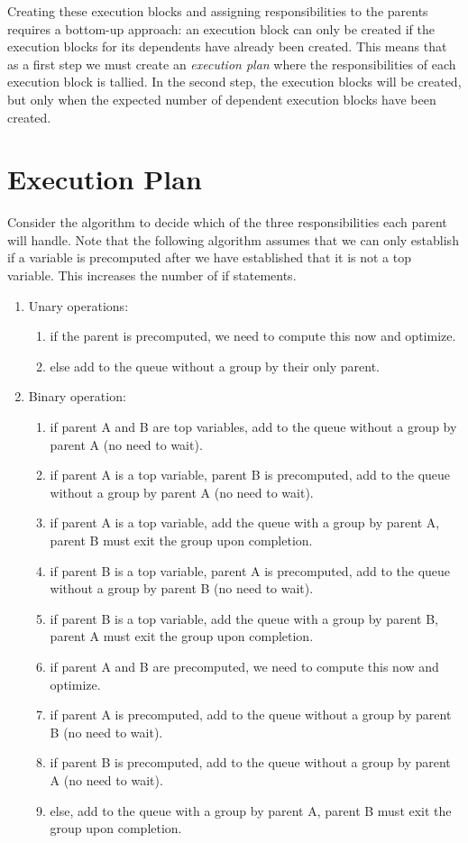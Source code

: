 \documentclass[11pt]{article}
\begin{document}
Creating these execution blocks and assigning responsibilities to the parents requires a bottom-up approach: an execution block can only be created if the execution blocks for its dependents have already been created. This means that as a first step we must create an \emph{execution plan} where the responsibilities of each execution block is tallied. In the second step, the execution blocks will be created, but only when the expected number of dependent execution blocks have been created.

\section{Execution Plan}

Consider the algorithm to decide which of the three responsibilities each parent will handle. Note that the following algorithm assumes that we can only establish if a variable is precomputed after we have established that it is not a top variable. This increases the number of if statements.

\begin{enumerate}
\item Unary operations:
\begin{enumerate}
\item if the parent is precomputed, we need to compute this now and optimize.
\item else add to the queue without a group by their only parent.
\end{enumerate}
\item Binary operation:
\begin{enumerate}
\item if parent A and B are top variables,  add to the queue without a group by parent A (no need to wait).
\item if parent A is a top variable, parent B is precomputed, add to the queue without a group by parent A (no need to wait).
\item if parent A is a top variable, add the queue with a group by parent A, parent B must exit the group upon completion.
\item if parent B is a top variable, parent A is precomputed, add to the queue without a group by parent B (no need to wait).
\item if parent B is a top variable, add the queue with a group by parent B, parent A must exit the group upon completion.
\item if parent A and B are precomputed, we need to compute this now and optimize.
\item if parent A is precomputed, add to the queue without a group by parent B (no need to wait).
\item if parent B is precomputed, add to the queue without a group by parent A (no need to wait).
\item else, add to the queue with a group by parent A, parent B must exit the group upon completion.
\end{enumerate}
\end{enumerate}
\end{document}

